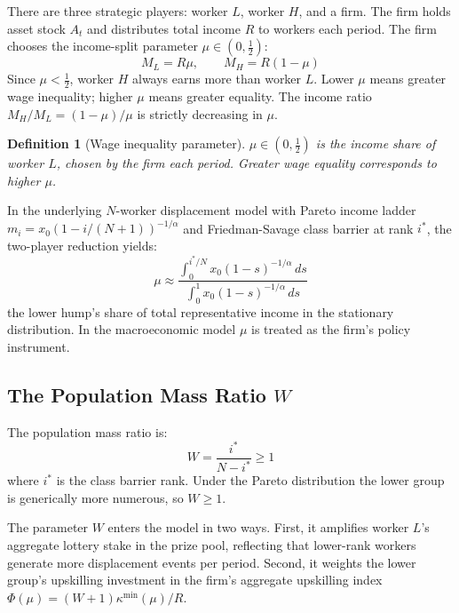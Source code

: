 \documentclass[12pt,a4paper]{article}
\newtheorem{definition}{Definition}
\begin{document}
There are three strategic players: worker $L$, worker $H$, and a firm.
The firm holds asset stock $A_t$ and distributes total income $R$ to
workers each period. The firm chooses the income-split parameter
$\mu \in (0,\tfrac{1}{2})$:
\begin{equation}
  M_L = R\mu, \qquad M_H = R(1-\mu)
  \label{eq:incomes}
\end{equation}
Since $\mu < \tfrac{1}{2}$, worker $H$ always earns more than worker
$L$. Lower $\mu$ means greater wage inequality; higher $\mu$ means
greater equality. The income ratio $M_H/M_L = (1-\mu)/\mu$ is strictly
decreasing in $\mu$.

\begin{definition}[Wage inequality parameter]
$\mu \in (0,\tfrac{1}{2})$ is the income share of worker $L$, chosen
by the firm each period. Greater wage equality corresponds to higher $\mu$.
\end{definition}

In the underlying $N$-worker displacement model with Pareto income
ladder $m_i = x_0(1-i/(N+1))^{-1/\alpha}$ and Friedman-Savage class
barrier at rank $i^*$, the two-player reduction yields:
\begin{equation}
  \mu \approx \frac{\displaystyle\int_0^{i^*/N}
    x_0(1-s)^{-1/\alpha}\,ds}
  {\displaystyle\int_0^{1} x_0(1-s)^{-1/\alpha}\,ds}
  \label{eq:mu_micro}
\end{equation}
the lower hump's share of total representative income in the stationary
distribution. In the macroeconomic model $\mu$ is treated as the firm's
policy instrument.

\subsection{The Population Mass Ratio $W$}

The population mass ratio is:
\begin{equation}
  W = \frac{i^*}{N - i^*} \geq 1
  \label{eq:W_def}
\end{equation}
where $i^*$ is the class barrier rank. Under the Pareto distribution
the lower group is generically more numerous, so $W \geq 1$.

The parameter $W$ enters the model in two ways. First, it amplifies
worker $L$'s aggregate lottery stake in the prize pool, reflecting
that lower-rank workers generate more displacement events per period.
Second, it weights the lower group's upskilling investment in the
firm's aggregate upskilling index $\Phi(\mu) = (W+1)\kappa^{\min}(\mu)/R$.
\end{document}
